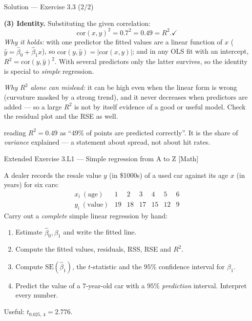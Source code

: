 \documentclass[aspectratio=169,11pt]{beamer}
\begin{document}
\begin{frame}{Solution --- Exercise 3.3 (2/2)}
  \begin{solutionbox}
    \textbf{(3) Identity.} Substituting the given correlation:
    \[
      \mathrm{cor}(x,y)^2 = 0.7^2 = 0.49 = R^2. \checkmark
    \]
    \emph{Why it holds:} with one predictor the fitted values are a
    linear function of $x$ ($\hat y=\hat\beta_0+\hat\beta_1 x$), so
    $\mathrm{cor}(y,\hat y)=|\mathrm{cor}(x,y)|$; and in any OLS fit
    with an intercept, $R^2=\mathrm{cor}(y,\hat y)^2$. With several
    predictors only the latter survives, so the identity is special to
    \emph{simple} regression.

    \emph{Why $R^2$ alone can mislead:} it can be high even when the
    linear form is wrong (curvature masked by a strong trend), and it
    never decreases when predictors are added --- so a large $R^2$ is
    not by itself evidence of a good or useful model. Check the
    residual plot and the RSE as well.
  \end{solutionbox}
  \begin{mistake}
    reading $R^2=0.49$ as ``49\% of points
    are predicted correctly''. It is the share of \emph{variance}
    explained --- a statement about spread, not about hit rates.
  \end{mistake}
\end{frame}

\begin{frame}{Extended Exercise 3.L1 --- Simple regression from A to Z [Math]}
  \begin{longexercise}
    A dealer records the resale value $y$ (in \$1000s) of a used car
    against its age $x$ (in years) for six cars:
    \[
      \begin{array}{c|cccccc}
        x_i\ (\text{age})   & 1 & 2 & 3 & 4 & 5 & 6\\ \hline
        y_i\ (\text{value}) & 19 & 18 & 17 & 15 & 12 & 9
      \end{array}
    \]
    Carry out a \emph{complete} simple linear regression by hand:
    \begin{enumerate}
      \item Estimate $\hat\beta_0,\hat\beta_1$ and write the fitted line.
      \item Compute the fitted values, residuals, RSS, RSE and $R^2$.
      \item Compute $\mathrm{SE}(\hat\beta_1)$, the $t$-statistic and the
            $95\%$ confidence interval for $\beta_1$.
      \item Predict the value of a $7$-year-old car with a $95\%$
            \emph{prediction} interval. Interpret every number.
    \end{enumerate}
    Useful: $t_{0.025,\,4}=2.776$.
  \end{longexercise}
\end{frame}
\end{document}
